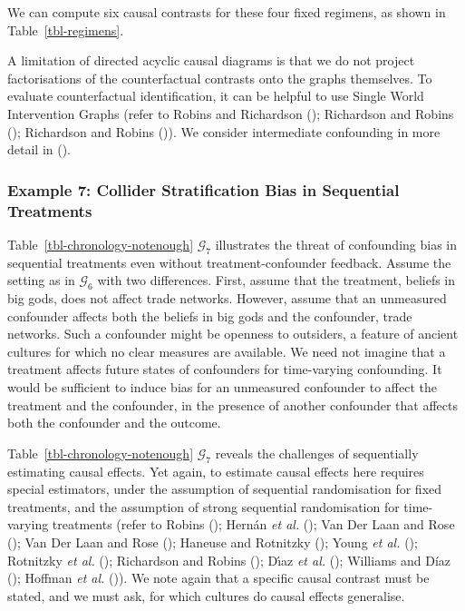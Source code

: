 \documentclass[
  single column]{article}
\begin{document}
We can compute six causal contrasts for these four fixed regimens, as
shown in Table~\ref{tbl-regimens}.

A limitation of directed acyclic causal diagrams is that we do not
project factorisations of the counterfactual contrasts onto the graphs
themselves. To evaluate counterfactual identification, it can be helpful
to use Single World Intervention Graphs (refer to Robins and Richardson
(); Richardson and Robins
(); Richardson and Robins
()). We consider
intermediate confounding in more detail in
().

\subsubsection{Example 7: Collider Stratification Bias in Sequential
Treatments}\label{example-7-collider-stratification-bias-in-sequential-treatments}

Table~\ref{tbl-chronology-notenough} \(\mathcal{G}_7\) illustrates the
threat of confounding bias in sequential treatments even without
treatment-confounder feedback. Assume the setting as in
\(\mathcal{G}_6\) with two differences. First, assume that the
treatment, beliefs in big gods, does not affect trade networks. However,
assume that an unmeasured confounder affects both the beliefs in big
gods and the confounder, trade networks. Such a confounder might be
openness to outsiders, a feature of ancient cultures for which no clear
measures are available. We need not imagine that a treatment affects
future states of confounders for time-varying confounding. It would be
sufficient to induce bias for an unmeasured confounder to affect the
treatment and the confounder, in the presence of another confounder that
affects both the confounder and the outcome.

Table~\ref{tbl-chronology-notenough} \(\mathcal{G}_7\) reveals the
challenges of sequentially estimating causal effects. Yet again, to
estimate causal effects here requires special estimators, under the
assumption of sequential randomisation for fixed treatments, and the
assumption of strong sequential randomisation for time-varying
treatments (refer to Robins (); Hernán
\emph{et al.} (); Van Der Laan
and Rose (); Van Der Laan and Rose
(); Haneuse and Rotnitzky
(); Young \emph{et al.}
(); Rotnitzky \emph{et al.}
(); Richardson and Robins
(); Dı́az \emph{et al.}
(); Williams and Díaz
(); Hoffman \emph{et al.}
()). We note again that a specific
causal contrast must be stated, and we must ask, for which cultures do
causal effects generalise.
\end{document}
